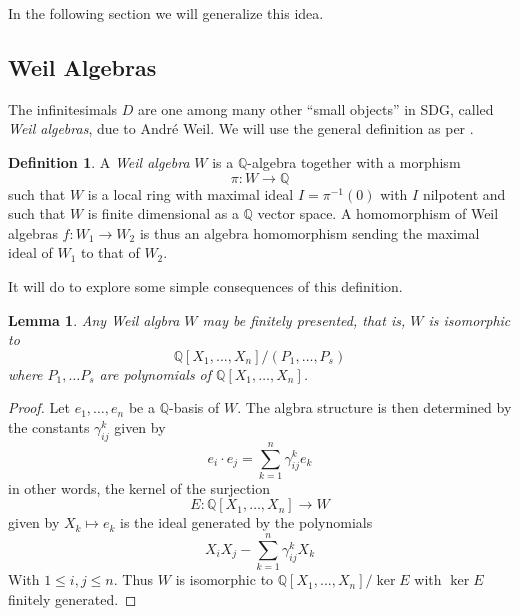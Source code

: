 \documentclass[11pt]{article}
\newtheorem{lemma}{Lemma}[section]
\theoremstyle{definition}
\newtheorem{defn}{Definition}[section]
\newcommand{\Q}{\mathbb{Q}}
\numberwithin{equation}{section}
\begin{document}
In the following section we will generalize this idea.

\subsection{Weil Algebras}

The infinitesimals \( D \) are one among many other ``small objects'' in SDG, called \emph{Weil algebras}, due to André Weil. We will use the general definition as per \cite{bun17}.

\begin{defn}
  A \emph{Weil algebra} \( W \) is a \( \Q \)-algebra together with a morphism
  \begin{equation*}
    \pi: W\to\Q
  \end{equation*}
  such that \( W \) is a local ring with maximal ideal \( I=\pi^{-1}(0) \) with \( I \) nilpotent and such that \( W \) is finite dimensional as a \( \Q \) vector space. A homomorphism of Weil algebras \( f:W_1\to W_2 \) is thus an algebra homomorphism sending the maximal ideal of \( W_1 \) to that of \( W_2 \).
\end{defn}



It will do to explore some simple consequences of this definition.

\begin{lemma}
  Any Weil algbra \( W \) may be finitely presented, that is, \( W \) is isomorphic to
  \begin{equation*}
    \Q[X_1,\dots,X_n]/(P_1,\dots,P_s)
  \end{equation*}
  where \( P_1,\dots P_s \) are polynomials of \( \Q[X_1,\dots,X_n] \).
  \label{lm:finpr}
\end{lemma}

\begin{proof}
  Let \( e_1,\dots,e_n \) be a \( \Q \)-basis of \( W \). The algbra structure is then determined by the constants \( \gamma_{ij}^k \) given by
  \begin{equation*}
    e_i\cdot e_j = \sum_{k=1}^n \gamma_{ij}^ke_k
  \end{equation*}
  in other words, the kernel of the surjection
  \begin{equation*}
    E: \Q[X_1,\dots,X_n]\to W
  \end{equation*}
  given by \( X_k\mapsto e_k \) is the ideal generated by the polynomials
  \begin{equation*}
    X_iX_j - \sum_{k=1}^n\gamma_{ij}^kX_k
  \end{equation*}
  With \( 1\leq i,j\leq n \). Thus \( W \) is isomorphic to \( \Q[X_1,\dots,X_n]/\ker E \) with \( \ker E \) finitely generated.
\end{proof}
\end{document}
